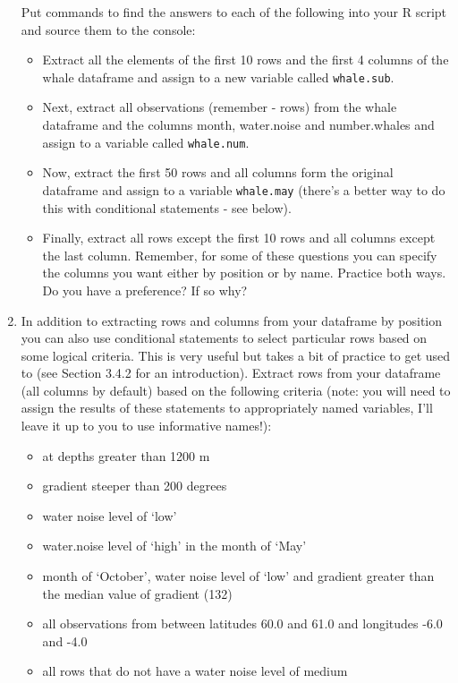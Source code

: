 \documentclass[12pt]{article}
\newcommand{\lst}[1]{\lstinline{#1}}
\begin{document}
\begin{enumerate}
Put commands to find the answers to 
each of the following into your R script and source them to the console:
\begin{itemize}

\item
Extract all the elements of the first 10 rows and the first 4 columns of the whale dataframe and assign to a new variable called \lst{whale.sub}.
\item
Next, extract all observations (remember - rows) from the whale dataframe and the columns month, water.noise and number.whales and assign to a variable called \lst{whale.num}.
\item
Now, extract the first 50 rows and all columns form the original dataframe and assign to a variable \lst{whale.may} (there’s a better way to do this with conditional statements - see below).
\item
Finally, extract all rows except the first 10 rows and all columns except the last column. Remember, for some of these questions you can specify the columns you want either by position or by name. Practice both ways. Do you have a preference? If so why?

 \end{itemize}

\item In addition to extracting rows and columns from your dataframe by position you can also use conditional statements to select particular rows based on some logical criteria. This is very useful but takes a bit of practice to get used to (see Section 3.4.2 for an introduction). Extract rows from your dataframe (all columns by default) based on the following criteria (note: you will need to assign the results of these statements to appropriately named variables, I’ll leave it up to you to use informative names!):
\begin{itemize}
\item
at depths greater than 1200 m
\item
gradient steeper than 200 degrees
\item
water noise level of ‘low’
\item
water.noise level of ‘high’ in the month of ‘May’
\item
month of ‘October’, water noise level of ‘low’ and gradient greater than the median value of gradient (132)
\item
all observations from between latitudes 60.0 and 61.0 and longitudes -6.0 and -4.0
\item
all rows that do not have a water noise level of medium
\end{itemize}


\end{enumerate}
\end{document}
